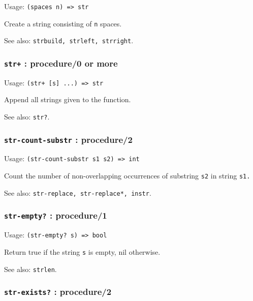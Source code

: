 \documentclass[
]{article}
\newcommand{\passthrough}[1]{#1}
\begin{document}
Usage: \passthrough{\lstinline!(spaces n) => str!}

Create a string consisting of \passthrough{\lstinline!n!} spaces.

See also: \passthrough{\lstinline!strbuild, strleft, strright!}.

\hypertarget{str-procedure0-or-more}{%
\subsubsection{\texorpdfstring{\texttt{str+} : procedure/0 or
more}{str+ : procedure/0 or more}}\label{str-procedure0-or-more}}

Usage: \passthrough{\lstinline!(str+ [s] ...) => str!}

Append all strings given to the function.

See also: \passthrough{\lstinline!str?!}.

\hypertarget{str-count-substr-procedure2}{%
\subsubsection{\texorpdfstring{\texttt{str-count-substr} :
procedure/2}{str-count-substr : procedure/2}}\label{str-count-substr-procedure2}}

Usage: \passthrough{\lstinline!(str-count-substr s1 s2) => int!}

Count the number of non-overlapping occurrences of substring
\passthrough{\lstinline!s2!} in string \passthrough{\lstinline!s1.!}

See also: \passthrough{\lstinline!str-replace, str-replace*, instr!}.

\hypertarget{str-empty-procedure1}{%
\subsubsection{\texorpdfstring{\texttt{str-empty?} :
procedure/1}{str-empty? : procedure/1}}\label{str-empty-procedure1}}

Usage: \passthrough{\lstinline!(str-empty? s) => bool!}

Return true if the string \passthrough{\lstinline!s!} is empty, nil
otherwise.

See also: \passthrough{\lstinline!strlen!}.

\hypertarget{str-exists-procedure2}{%
\subsubsection{\texorpdfstring{\texttt{str-exists?} :
procedure/2}{str-exists? : procedure/2}}\label{str-exists-procedure2}}
\end{document}
